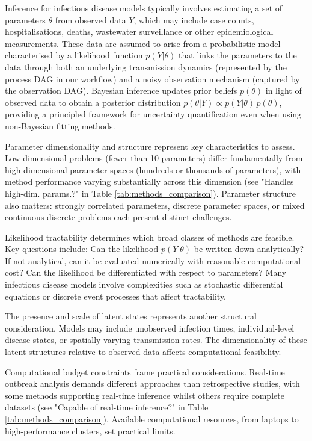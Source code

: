 \documentclass{article}
\begin{document}
Inference for infectious disease models typically involves estimating a set of parameters $\theta$ from observed data $Y$, which may include case counts, hospitalisations, deaths, wastewater surveillance or other epidemiological measurements.
These data are assumed to arise from a probabilistic model characterised by a likelihood function $p(Y | \theta)$ that links the parameters to the data through both an underlying transmission dynamics (represented by the process DAG in our workflow) and a noisy observation mechanism (captured by the observation DAG).
Bayesian inference updates prior beliefs $p(\theta)$ in light of observed data to obtain a posterior distribution $p(\theta | Y) \propto p(Y|\theta) \,p(\theta)$, providing a principled framework for uncertainty quantification even when using non-Bayesian fitting methods.

Parameter dimensionality and structure represent key characteristics to assess.
Low-dimensional problems (fewer than 10 parameters) differ fundamentally from high-dimensional parameter spaces (hundreds or thousands of parameters), with method performance varying substantially across this dimension (see "Handles high-dim. params.?" in Table \ref{tab:methods_comparison}).
Parameter structure also matters: strongly correlated parameters, discrete parameter spaces, or mixed continuous-discrete problems each present distinct challenges.

Likelihood tractability determines which broad classes of methods are feasible.
Key questions include: Can the likelihood $p(Y | \theta)$ be written down analytically?
If not analytical, can it be evaluated numerically with reasonable computational cost?
Can the likelihood be differentiated with respect to parameters?
Many infectious disease models involve complexities such as stochastic differential equations or discrete event processes that affect tractability.

The presence and scale of latent states represents another structural consideration.
Models may include unobserved infection times, individual-level disease states, or spatially varying transmission rates.
The dimensionality of these latent structures relative to observed data affects computational feasibility.

Computational budget constraints frame practical considerations.
Real-time outbreak analysis demands different approaches than retrospective studies, with some methods supporting real-time inference whilst others require complete datasets (see "Capable of real-time inference?" in Table \ref{tab:methods_comparison}).
Available computational resources, from laptops to high-performance clusters, set practical limits.
\end{document}

